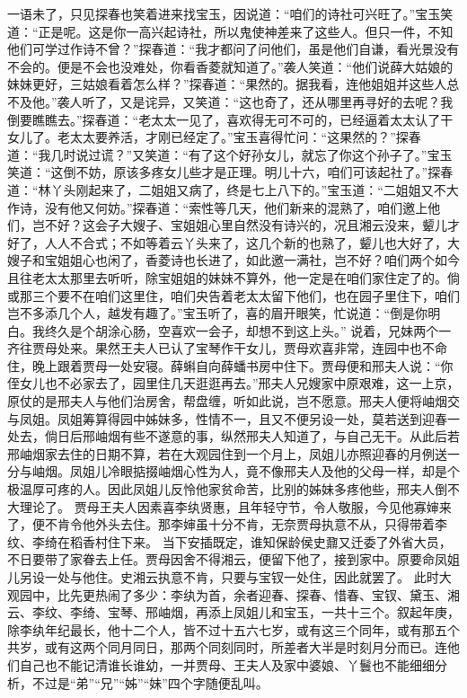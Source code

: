 \documentclass[12pt,oneside]{book}
\begin{document}
一语未了，只见探春也笑着进来找宝玉，因说道：“咱们的诗社可兴旺了。”宝玉笑道：“正是呢。这是你一高兴起诗社，所以鬼使神差来了这些人。但只一件，不知他们可学过作诗不曾？”探春道：“我才都问了问他们，虽是他们自谦，看光景没有不会的。便是不会也没难处，你看香菱就知道了。”袭人笑道：“他们说薛大姑娘的妹妹更好，三姑娘看着怎么样？”探春道：“果然的。据我看，连他姐姐并这些人总不及他。”袭人听了，又是诧异，又笑道：“这也奇了，还从哪里再寻好的去呢？我倒要瞧瞧去。”探春道：“老太太一见了，喜欢得无可不可的，已经逼着太太认了干女儿了。老太太要养活，才刚已经定了。”宝玉喜得忙问：“这果然的？”探春道：“我几时说过谎？”又笑道：“有了这个好孙女儿，就忘了你这个孙子了。”宝玉笑道：“这倒不妨，原该多疼女儿些才是正理。明儿十六，咱们可该起社了。”探春道：“林丫头刚起来了，二姐姐又病了，终是七上八下的。”宝玉道：“二姐姐又不大作诗，没有他又何妨。”探春道：“索性等几天，他们新来的混熟了，咱们邀上他们，岂不好？这会子大嫂子、宝姐姐心里自然没有诗兴的，况且湘云没来，颦儿才好了，人人不合式；不如等着云丫头来了，这几个新的也熟了，颦儿也大好了，大嫂子和宝姐姐心也闲了，香菱诗也长进了，如此邀一满社，岂不好？咱们两个如今且往老太太那里去听听，除宝姐姐的妹妹不算外，他一定是在咱们家住定了的。倘或那三个要不在咱们这里住，咱们央告着老太太留下他们，也在园子里住下，咱们岂不多添几个人，越发有趣了。”宝玉听了，喜的眉开眼笑，忙说道：“倒是你明白。我终久是个胡涂心肠，空喜欢一会子，却想不到这上头。”
说着，兄妹两个一齐往贾母处来。果然王夫人已认了宝琴作干女儿，贾母欢喜非常，连园中也不命住，晚上跟着贾母一处安寝。薛蝌自向薛蟠书房中住下。贾母便和邢夫人说：“你侄女儿也不必家去了，园里住几天逛逛再去。”邢夫人兄嫂家中原艰难，这一上京，原仗的是邢夫人与他们治房舍，帮盘缠，听如此说，岂不愿意。邢夫人便将岫烟交与凤姐。凤姐筹算得园中姊妹多，性情不一，且又不便另设一处，莫若送到迎春一处去，倘日后邢岫烟有些不遂意的事，纵然邢夫人知道了，与自己无干。从此后若邢岫烟家去住的日期不算，若在大观园住到一个月上，凤姐儿亦照迎春的月例送一分与岫烟。凤姐儿冷眼掂掇岫烟心性为人，竟不像邢夫人及他的父母一样，却是个极温厚可疼的人。因此凤姐儿反怜他家贫命苦，比别的姊妹多疼他些，邢夫人倒不大理论了。
贾母王夫人因素喜李纨贤惠，且年轻守节，令人敬服，今见他寡婶来了，便不肯令他外头去住。那李婶虽十分不肯，无奈贾母执意不从，只得带着李纹、李绮在稻香村住下来。
当下安插既定，谁知保龄侯史鼐又迁委了外省大员，不日要带了家眷去上任。贾母因舍不得湘云，便留下他了，接到家中。原要命凤姐儿另设一处与他住。史湘云执意不肯，只要与宝钗一处住，因此就罢了。
此时大观园中，比先更热闹了多少：李纨为首，余者迎春、探春、惜春、宝钗、黛玉、湘云、李纹、李绮、宝琴、邢岫烟，再添上凤姐儿和宝玉，一共十三个。叙起年庚，除李纨年纪最长，他十二个人，皆不过十五六七岁，或有这三个同年，或有那五个共岁，或有这两个同月同日，那两个同刻同时，所差者大半是时刻月分而已。连他们自己也不能记清谁长谁幼，一并贾母、王夫人及家中婆娘、丫鬟也不能细细分析，不过是“弟”“兄”“姊”“妹”四个字随便乱叫。
\end{document}
